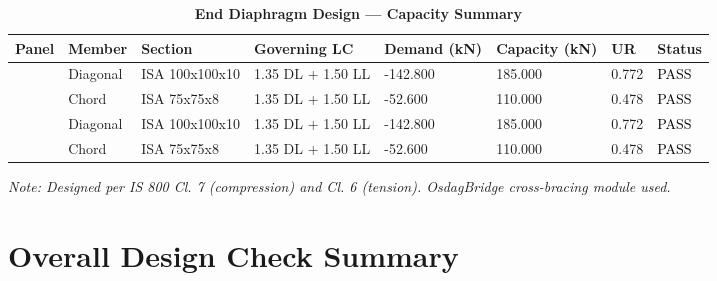 \documentclass[12pt,a4paper]{report}
\numberwithin{table}{chapter}
\numberwithin{figure}{chapter}
\begin{document}
\vspace{1em}

\begin{longtable}{|C{2.0cm}|L{1.8cm}|C{2.2cm}|C{3.0cm}|C{1.8cm}|C{1.8cm}|C{1.2cm}|C{1.8cm}|}
\caption{\textbf{End Diaphragm Design --- Capacity Summary}}
\hline
\textbf{Panel} & \textbf{Member} & \textbf{Section} & \textbf{Governing LC} & \textbf{Demand (kN)} & \textbf{Capacity (kN)} & \textbf{UR} & \textbf{Status} \\[6pt]
\hline
{} & Diagonal & ISA 100x100x10 & 1.35 DL + 1.50 LL & -142.800 & 185.000 & 0.772 & \textcolor{black}{PASS} \\[6pt]
 & Chord & ISA 75x75x8 & 1.35 DL + 1.50 LL & -52.600 & 110.000 & 0.478 & \textcolor{black}{PASS} \\[6pt]
\hline
{} & Diagonal & ISA 100x100x10 & 1.35 DL + 1.50 LL & -142.800 & 185.000 & 0.772 & \textcolor{black}{PASS} \\[6pt]
 & Chord & ISA 75x75x8 & 1.35 DL + 1.50 LL & -52.600 & 110.000 & 0.478 & \textcolor{black}{PASS} \\[6pt]
\hline
\end{longtable}
\noindent\textit{Note: Designed per IS 800 Cl. 7 (compression) and Cl. 6 (tension). OsdagBridge cross-bracing module used.}

\section{Overall Design Check Summary}
\label{sec:overall-summary}
\end{document}
